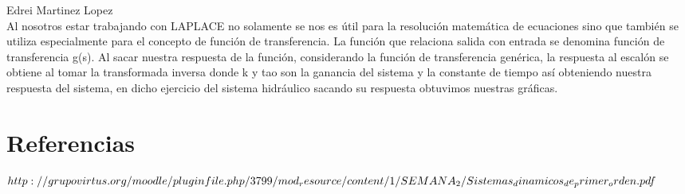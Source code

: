 \documentclass[12pt,a4paper]{report}
\begin{document}
Edrei Martinez Lopez\\

Al nosotros estar trabajando con LAPLACE no solamente se nos es útil para la resolución matemática de ecuaciones sino que también se utiliza especialmente para el concepto de función de transferencia. La función que relaciona salida con entrada se denomina función de transferencia g(s). Al sacar nuestra respuesta de la función, considerando la función de transferencia genérica, la respuesta al escalón se obtiene al tomar la transformada inversa donde k y tao son la ganancia del sistema y la constante de tiempo así obteniendo nuestra respuesta del sistema, en dicho ejercicio del sistema hidráulico sacando su respuesta obtuvimos nuestras gráficas.

\chapter{Referencias}
$http://grupovirtus.org/moodle/pluginfile.php/3799/mod_resource/content\\/1/SEMANA_2/Sistemas_dinamicos_de_primer_orden.pdf$\label{ft} 
\end{document}
